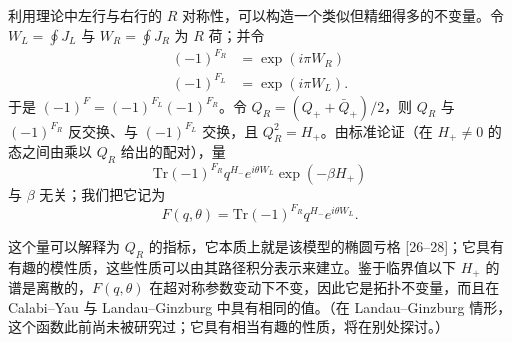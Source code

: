 \label{op:32}
利用理论中左行与右行的 $R$ 对称性，可以构造一个类似但精细得多的不变量。令 $W_{L}=\oint J_{L}$ 与 $W_{R}=\oint J_{R}$ 为 $R$ 荷；并令
\begin{equation}
\tag{3.27}
\begin{aligned}
(-1)^{F_{R}}&=\exp(i\pi W_{R})\\
(-1)^{F_{L}}&=\exp(i\pi W_{L}).
\end{aligned}
\end{equation}
于是 $(-1)^{F}=(-1)^{F_{L}}(-1)^{F_{R}}$。令 $Q_{R}=(Q_{+}+\bar Q_{+})/2$，则 $Q_{R}$ 与 $(-1)^{F_{R}}$ 反交换、与 $(-1)^{F_{L}}$ 交换，且 $Q_{R}^{2}=H_{+}$。由标准论证（在 $H_{+}\neq0$ 的态之间由乘以 $Q_{R}$ 给出的配对），量
\begin{equation}
\tag{3.28}
\mathrm{Tr}(-1)^{F_{R}}q^{H_{-}}e^{i\theta W_{L}}\exp(-\beta H_{+})
\end{equation}
与 $\beta$ 无关；我们把它记为
\begin{equation}
\tag{3.29}
F(q,\theta)=\mathrm{Tr}(-1)^{F_{R}}q^{H_{-}}e^{i\theta W_{L}}.
\end{equation}


这个量可以解释为 $Q_{R}$ 的指标，它本质上就是该模型的椭圆亏格 [26--28]；它具有有趣的模性质，这些性质可以由其路径积分表示来建立。鉴于临界值以下 $H_{+}$ 的谱是离散的，$F(q,\theta)$ 在超对称参数变动下不变，因此它是拓扑不变量，而且在 Calabi--Yau 与 Landau--Ginzburg 中具有相同的值。（在 Landau--Ginzburg 情形，这个函数此前尚未被研究过；它具有相当有趣的性质，将在别处探讨。）


